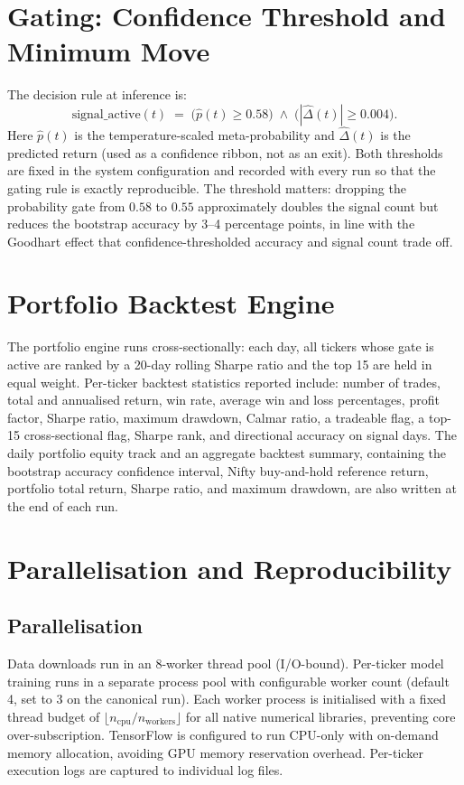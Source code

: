 \section{Gating: Confidence Threshold and Minimum Move}

The decision rule at inference is:
\[
\boxed{
\mathrm{signal\_active}(t) \;=\; \big(\hat p(t) \geq 0.58\big) \;\wedge\; \big(|\widehat{\Delta}(t)| \geq 0.004\big).
}
\]
Here $\hat p(t)$ is the temperature-scaled meta-probability and $\widehat{\Delta}(t)$ is the predicted return (used as a confidence ribbon, not as an exit). Both thresholds are fixed in the system configuration and recorded with every run so that the gating rule is exactly reproducible. The threshold matters: dropping the probability gate from $0.58$ to $0.55$ approximately doubles the signal count but reduces the bootstrap accuracy by 3--4 percentage points, in line with the Goodhart effect that confidence-thresholded accuracy and signal count trade off.

\section{Portfolio Backtest Engine}

The portfolio engine runs cross-sectionally: each day, all tickers whose gate is active are ranked by a 20-day rolling Sharpe ratio and the top 15 are held in equal weight. Per-ticker backtest statistics reported include: number of trades, total and annualised return, win rate, average win and loss percentages, profit factor, Sharpe ratio, maximum drawdown, Calmar ratio, a tradeable flag, a top-15 cross-sectional flag, Sharpe rank, and directional accuracy on signal days. The daily portfolio equity track and an aggregate backtest summary, containing the bootstrap accuracy confidence interval, Nifty buy-and-hold reference return, portfolio total return, Sharpe ratio, and maximum drawdown, are also written at the end of each run.

\section{Parallelisation and Reproducibility}

\subsection{Parallelisation}

Data downloads run in an 8-worker thread pool (I/O-bound). Per-ticker model training runs in a separate process pool with configurable worker count (default 4, set to 3 on the canonical run). Each worker process is initialised with a fixed thread budget of $\lfloor n_{\mathrm{cpu}} / n_{\mathrm{workers}} \rfloor$ for all native numerical libraries, preventing core over-subscription. TensorFlow is configured to run CPU-only with on-demand memory allocation, avoiding GPU memory reservation overhead. Per-ticker execution logs are captured to individual log files.

